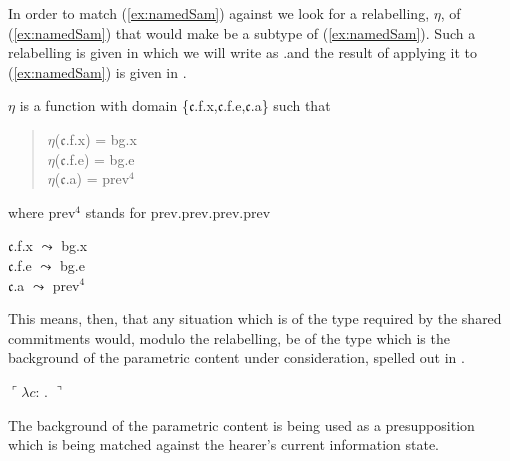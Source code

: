 In order to match (\ref{ex:namedSam})  against \preveg{}  we look
for a relabelling, $\eta$, of (\ref{ex:namedSam}) that would make
\preveg{} be a subtype of (\ref{ex:namedSam}).  Such a
relabelling is given in  which we will write as .and the result of applying it to
(\ref{ex:namedSam}) is given in .
\begin{ex}
\begin{subex}
\item $\eta$ is a function with domain \{$\mathfrak{c}$.f.x,$\mathfrak{c}$.f.e,$\mathfrak{c}$.a\} such that
\begin{quote}
$\eta$($\mathfrak{c}$.f.x) = bg.x\\
$\eta$($\mathfrak{c}$.f.e) = bg.e\\
$\eta$($\mathfrak{c}$.a) = prev$^4$
\end{quote}
where prev$^4$ stands for prev.prev.prev.prev
\item $\mathfrak{c}$.f.x $\leadsto$ bg.x\\
$\mathfrak{c}$.f.e $\leadsto$ bg.e\\
$\mathfrak{c}$.a $\leadsto$ prev$^4$
 
\item 
{}

\end{subex}
\end{ex}
This means, then, that any situation which is of the type required by
the shared commitments would, modulo the relabelling, be of the type
which is the background of the parametric content under consideration,
spelled out in \nexteg{}.
\begin{ex}
$\ulcorner\lambda
c$: . 
$\urcorner$ 
\label{ex:pcont-samleft} 
\end{ex}
The background of the parametric content is
being used as a presupposition which is being matched against the
hearer's current information state.

